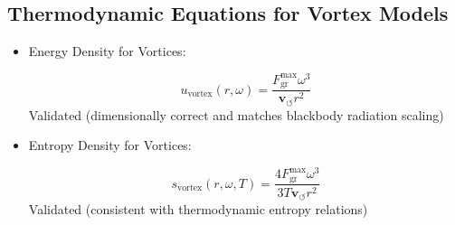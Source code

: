 \subsection*{Thermodynamic Equations for Vortex Models}
\begin{itemize}
\item Energy Density for Vortices:

\[
u_\text{vortex}(r, \omega) = \frac{F^{\text{max}}_{\text{gr}} \omega^3}{\mathbf{v}_{\scriptscriptstyle\boldsymbol{\circlearrowleft}} r^2}
\]
 Validated (dimensionally correct and matches blackbody radiation scaling)

\item Entropy Density for Vortices:

\[
s_\text{vortex}(r, \omega, T) = \frac{4 F^{\text{max}}_{\text{gr}} \omega^3}{3 T \mathbf{v}_{\scriptscriptstyle\boldsymbol{\circlearrowleft}} r^2}
\]
 Validated (consistent with thermodynamic entropy relations)

\end{itemize}